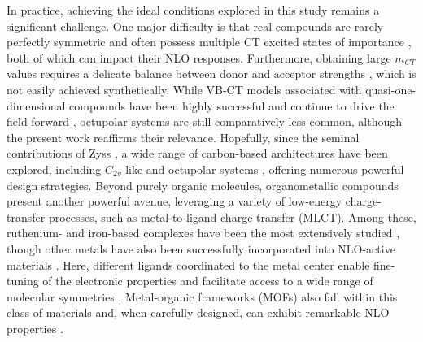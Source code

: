 \documentclass[USenglish]{article}
\begin{document}
In practice, achieving the ideal conditions explored in this study remains a significant challenge. One major difficulty is that real compounds are rarely perfectly symmetric and often possess multiple CT excited states of importance \cite{zhangTheoreticalInvestigationFirst2013}, both of which can impact their NLO responses. Furthermore, obtaining large $m_{CT}$ values requires a delicate balance between donor and acceptor strengths \cite{beaujeanUnravelingSymmetryEffects2022,postilsSecondorderNonlinearOptical2024}, which is not easily achieved synthetically.
While VB-CT models associated with quasi-one-dimensional compounds have been highly successful \cite{bourhillExperimentalDemonstrationDependence1994,daltonOrganicElectroOpticsPhotonics2015,wuHighperformanceOrganicSecond2020} and continue to drive the field forward \cite{dalton25YearsOrganic2019,dubuisNonlinearOpticalResponses2023,dellaiDynamicEffectsNonlinear2024}, octupolar systems are still comparatively less common, although the present work reaffirms their relevance. Hopefully, since the seminal contributions of Zyss \cite{zyssMolecularEngineeringImplications1993}, a wide range of carbon-based architectures have been explored, including $C_{2v}$-like \cite{yangLargeOffDiagonalContribution2003,castetSecondorderNonlinearOptical2021,postilsSecondorderNonlinearOptical2024} and octupolar systems \cite{choElementaryDescriptionNonlinear1998,panjaSumoverstateSchemeAnalysis2010,beaujeanMultiStateSecondOrderNonlinear2022}, offering numerous powerful design strategies.
Beyond purely organic molecules, organometallic compounds present another powerful avenue, leveraging a variety of low-energy charge-transfer processes, such as metal-to-ligand charge transfer (MLCT). Among these, ruthenium- and iron-based complexes have been the most extensively studied \cite{coeDevelopingIronRuthenium2013,ashcroftMolecularEngineeringOrganic2019}, though other metals have also been successfully incorporated into NLO-active materials \cite{costesSynthesisCrystalStructures2005,lamereSynthesisCharacterizationNonlinear2006,lacroixSecondorderNonlinearOptics2016}. Here, different ligands coordinated to the metal center enable fine-tuning of the electronic properties and facilitate access to a wide range of molecular symmetries \cite{ashcroftMolecularEngineeringOrganic2019,beaujeanUnravelingSymmetryEffects2022,hoodSynthesisOpticalNonlinear2024}. Metal-organic frameworks (MOFs) also fall within this class of materials and, when carefully designed, can exhibit remarkable NLO properties \cite{medishettyNonlinearOpticalProperties2017,chengNonlinearOpticalProperties2021}.
\end{document}

